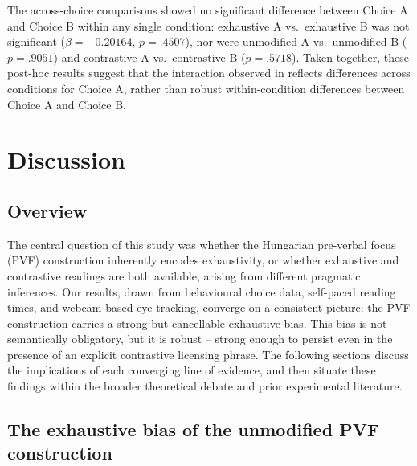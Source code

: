 \documentclass[a4paper, ruler]{CUP-JNL-LIN}%
\begin{document}
The across-choice comparisons showed no significant difference between Choice A and Choice B within any single condition: exhaustive A vs.\ exhaustive B was not significant ($\beta=-0.20164$, $p=.4507$), nor were unmodified A vs.\ unmodified B ($p=.9051$) and contrastive A vs.\ contrastive B ($p=.5718$). Taken together, these post-hoc results suggest that the interaction observed in reflects differences across conditions for Choice A, rather than robust within-condition differences between Choice A and Choice B.







\section{Discussion}
\label{sec:discussion}

\subsection{Overview}

The central question of this study was whether the Hungarian pre-verbal focus (PVF) construction inherently encodes exhaustivity, or whether exhaustive and contrastive readings are both available, arising from different pragmatic inferences. Our results, drawn from behavioural choice data, self-paced reading times, and webcam-based eye tracking, converge on a consistent picture: the PVF construction carries a strong but cancellable exhaustive bias. This bias is not semantically obligatory, but it is robust -- strong enough to persist even in the presence of an explicit contrastive licensing phrase. The following sections discuss the implications of each converging line of evidence, and then situate these findings within the broader theoretical debate and prior experimental literature.



\subsection{The exhaustive bias of the unmodified PVF construction}
\end{document}
